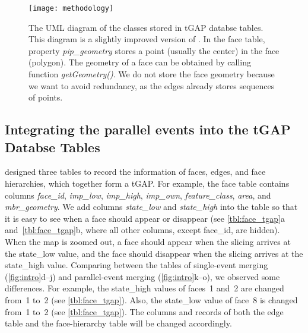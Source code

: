 \documentclass[ijgi,article,submit,moreauthors,pdftex]{Definitions/mdpi}
\begin{document}
\begin{figure}[tb]
\centering
\texttt{[image: methodology]}
\caption{The UML diagram of the classes stored in tGAP databse tables.
This diagram is a slightly improved version of \citet[]{Meijers2011Thesis}.
In the face table, property \emph{pip\_geometry} 
stores a point (usually the center) in the face (polygon).
The geometry of a face can be obtained by calling function \emph{getGeometry()}.
We do not store the face geometry because we want to avoid redundancy,
as the edges already stores sequences of points.
}
\label{fig:uml_tgap}
\end{figure}








\subsection{Integrating the parallel events into the tGAP Databse Tables}
\label{sec:integrate_tgap}

\citet[]{Meijers2011Thesis} designed three tables 
to record the information of
faces, edges, and face hierarchies, 
which together form a tGAP.
For example, the face table contains columns \emph{face\_id}, 
\emph{imp\_low}, \emph{imp\_high}, \emph{imp\_own},
\emph{feature\_class}, \emph{area}, and \emph{mbr\_geometry}.
We add columns \emph{state\_low} and \emph{state\_high} into the table 
so that it is easy to see when a face should appear or disappear 
(see \tbls\ref{tbl:face_tgap}a and~\ref{tbl:face_tgap}b,
where all other columns, except face\_id, are hidden).
When the map is zoomed out, a face should appear
when the slicing arrives at the state\_low value,
and the face should disappear
when the slicing arrives at the state\_high value.
Comparing between the tables of single-event merging 
(\figs\ref{fig:intro}d--j)
and parallel-event merging (\figs\ref{fig:intro}k--o),
we observed some differences.
For example, the state\_high values of faces~1 and~2 are changed from~1 to~2
(see \tbl\ref{tbl:face_tgap}).
Also, the state\_low value of face~8 is changed from~1 to~2
(see \tbl\ref{tbl:face_tgap}).
The columns and records of both the edge table and the face-hierarchy table 
will be changed accordingly.
\end{document}
